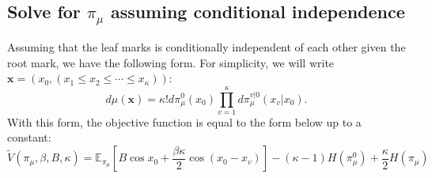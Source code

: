 \documentclass[12pt]{article}
\numberwithin{equation}{section}
\begin{document}
\subsection{Solve for $\pi_\mu$ assuming conditional independence}

Assuming that the leaf marks is conditionally independent of each other given the root mark, we have the following form.
For simplicity, we will write $\mathbf{x} = (x_0, (x_1 \leq x_2 \leq \cdots \leq x_\kappa))$:
\begin{equation}
    d\mu(\mathbf{x})=\kappa!d\pi_\mu^0(x_0) \prod_{v=1}^\kappa d\pi_\mu^{v|0}(x_v|x_0).
    \label{Eq.XY-conditional-independent}
\end{equation}
With this form, the objective function is equal to the form below up to a constant:
\begin{equation}
    \widetilde{V}(\pi_\mu, \beta, B, \kappa) = \mathbb{E}_{\pi_\mu}\left[B\cos x_0 + \frac{\beta\kappa}{2}\cos(x_0-x_v)\right]
    - (\kappa-1)H(\pi_\mu^0) + \frac\kappa2 H(\pi_\mu)
    \label{Eq.XY-Vtilde}
\end{equation}
\end{document}

